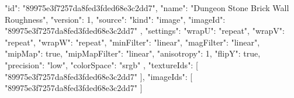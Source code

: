 {
  "id": "89975e3f7257da8fed3fded68e3c2dd7",
  "name": "Dungeon Stone Brick Wall Roughness",
  "version": 1,
  "source": {
    "kind": "image",
    "imageId": "89975e3f7257da8fed3fded68e3c2dd7"
  },
  "settings": {
    "wrapU": "repeat",
    "wrapV": "repeat",
    "wrapW": "repeat",
    "minFilter": "linear",
    "magFilter": "linear",
    "mipMap": true,
    "mipMapFilter": "linear",
    "anisotropy": 1,
    "flipY": true,
    "precision": "low",
    "colorSpace": "srgb"
  },
  "textureIds": [
    "89975e3f7257da8fed3fded68e3c2dd7"
  ],
  "imageIds": [
    "89975e3f7257da8fed3fded68e3c2dd7"
  ]
}
